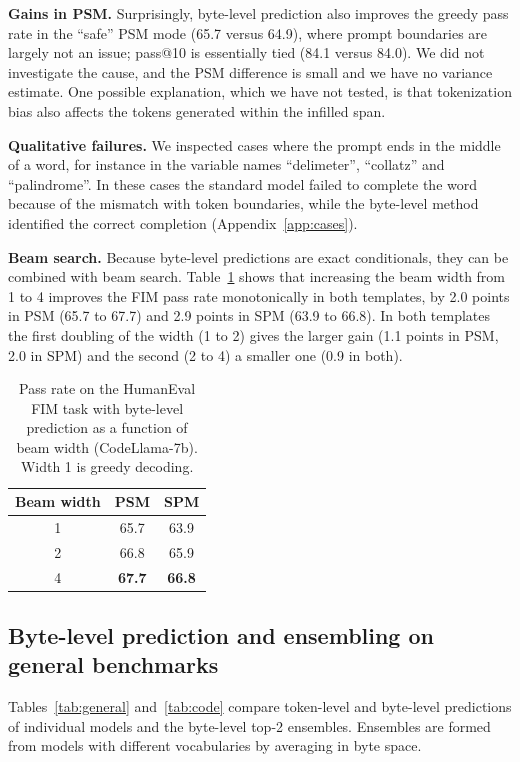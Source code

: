 \documentclass{article} %
\begin{document}
\textbf{Gains in PSM.} Surprisingly, byte-level prediction also improves the greedy pass rate in the ``safe'' PSM mode (65.7 versus 64.9), where prompt boundaries are largely not an issue; pass@10 is essentially tied (84.1 versus 84.0). We did not investigate the cause, and the PSM difference is small and we have no variance estimate. One possible explanation, which we have not tested, is that tokenization bias also affects the tokens generated within the infilled span.

\textbf{Qualitative failures.} We inspected cases where the prompt ends in the middle of a word, for instance in the variable names ``delimeter'', ``collatz'' and ``palindrome''. In these cases the standard model failed to complete the word because of the mismatch with token boundaries, while the byte-level method identified the correct completion (Appendix~\ref{app:cases}).

\textbf{Beam search.} Because byte-level predictions are exact conditionals, they can be combined with beam search. Table~\ref{tab:beam} shows that increasing the beam width from 1 to 4 improves the FIM pass rate monotonically in both templates, by 2.0 points in PSM (65.7 to 67.7) and 2.9 points in SPM (63.9 to 66.8). In both templates the first doubling of the width (1 to 2) gives the larger gain (1.1 points in PSM, 2.0 in SPM) and the second (2 to 4) a smaller one (0.9 in both).

\begin{table}[t]
\caption{Pass rate on the HumanEval FIM task with byte-level prediction as a function of beam width (CodeLlama-7b). Width 1 is greedy decoding.}
\label{tab:beam}
\begin{center}
\begin{tabular}{ccc}
\toprule
\multicolumn{1}{c}{\bf Beam width} & \multicolumn{1}{c}{\bf PSM} & \multicolumn{1}{c}{\bf SPM} \\
\midrule
1 & 65.7 & 63.9 \\
2 & 66.8 & 65.9 \\
4 & \textbf{67.7} & \textbf{66.8} \\
\bottomrule
\end{tabular}
\end{center}
\end{table}

\subsection{Byte-level prediction and ensembling on general benchmarks}
\label{sec:ensemble_exp}
Tables~\ref{tab:general} and~\ref{tab:code} compare token-level and byte-level predictions of individual models and the byte-level top-2 ensembles. Ensembles are formed from models with different vocabularies by averaging in byte space.
\end{document}
